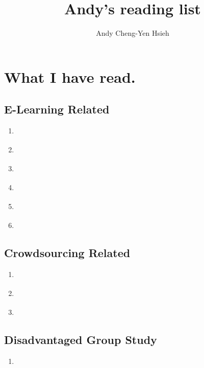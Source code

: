 \documentclass[a4paper]{article}
\title{\textbf{Andy's reading list}}
\author{Andy Cheng-Yen Hsieh}
\begin{document}
\maketitle

\section{What I have read.}

\subsection{E-Learning Related}
\begin{enumerate}
\item \cite{aljenaa2011towards}
\item \cite{siever2014leveraging}
\item \cite{coffrin2014visualizing}
\item \cite{priego2013engagement}
\item \cite{fox2012crossing}
\item \cite{zaharias2006usability}
\end{enumerate}
\subsection{Crowdsourcing Related}
\begin{enumerate}
\item \cite{oeldorf2014search}
\item \cite{ploderer2010collaboration}
\item \cite{tang2011leveraging}
\end{enumerate}
\subsection{Disadvantaged Group Study}
\begin{enumerate}
\item \cite{zyskowski2015accessible}
\end{enumerate}

 

\end{document}
